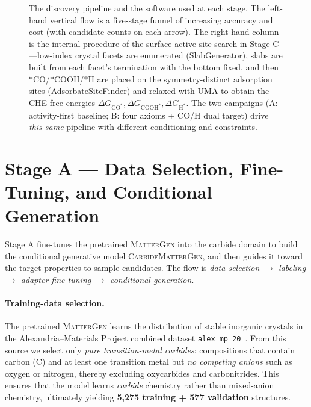 \documentclass[11pt,a4paper]{report}
\newcommand{\dGCO}{\Delta G_{\mathrm{CO^*}}}
\newcommand{\dGH}{\Delta G_{\mathrm{H^*}}}
\newcommand{\dGCOOH}{\Delta G_{\mathrm{COOH^*}}}
\begin{document}
\begin{figure}[t]
\caption{The discovery pipeline and the software used at each stage. The left-hand vertical flow is a five-stage
funnel of increasing accuracy and cost (with candidate counts on each arrow). The right-hand column is the internal procedure of the surface active-site search in Stage C---low-index crystal facets are
enumerated (SlabGenerator), slabs are built from each facet's termination with the bottom fixed, and then $*$CO/$*$COOH/$*$H are placed on the symmetry-distinct adsorption
sites (AdsorbateSiteFinder) and relaxed with UMA to obtain the CHE free energies
$\dGCO,\dGCOOH,\dGH$. The two campaigns (A: activity-first baseline; B: four axioms + CO/H dual target) drive
\emph{this same} pipeline with different conditioning and constraints.}
\label{fig:flow}
\end{figure}

\section{Stage A --- Data Selection, Fine-Tuning, and Conditional Generation}
\label{sec:methods-stageA}
Stage A fine-tunes the pretrained \textsc{MatterGen} into the carbide domain to build the conditional generative model
\textsc{CarbideMatterGen}, and then guides it toward the target properties to sample candidates. The flow is
\emph{data selection $\to$ labeling $\to$ adapter fine-tuning $\to$ conditional generation}.

\paragraph{Training-data selection.} The pretrained \textsc{MatterGen} learns the distribution of stable inorganic crystals in the Alexandria--Materials Project combined
dataset \texttt{alex\_mp\_20}~\cite{zeni2025}. From this source we select only
\emph{pure transition-metal carbides}: compositions that contain carbon (C) and at least one transition metal but \emph{no competing anions} such as oxygen or nitrogen,
thereby excluding oxycarbides and carbonitrides. This ensures that the model learns \emph{carbide}
chemistry rather than mixed-anion chemistry, ultimately yielding \textbf{5{,}275 training +
577 validation} structures.
\end{document}
